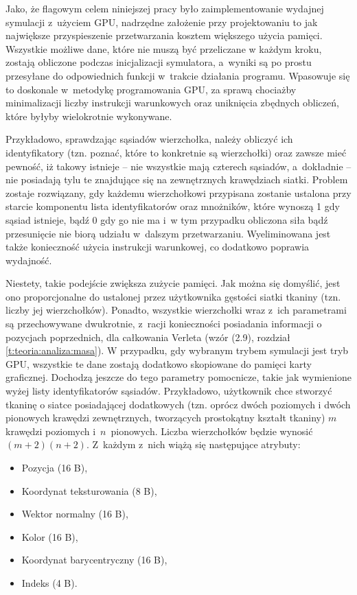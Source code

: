 	Jako, że flagowym celem niniejszej pracy było zaimplementowanie wydajnej symulacji z~użyciem GPU, nadrzędne założenie przy projektowaniu to jak największe przyspieszenie przetwarzania kosztem większego użycia pamięci. Wszystkie możliwe dane, które nie muszą być przeliczane w każdym kroku, zostają obliczone podczas inicjalizacji symulatora, a~wyniki są po prostu przesyłane do odpowiednich funkcji w~trakcie działania programu. Wpasowuje się to doskonale w~metodykę programowania GPU, za sprawą chociażby minimalizacji liczby instrukcji warunkowych oraz uniknięcia zbędnych obliczeń, które byłyby wielokrotnie wykonywane.
	
	Przykładowo, sprawdzając sąsiadów wierzchołka, należy obliczyć ich identyfikatory (tzn. poznać, które to konkretnie są wierzchołki) oraz zawsze mieć pewność, iż takowy istnieje -- nie wszystkie mają czterech sąsiadów, a~dokładnie -- nie posiadają tylu te znajdujące się na zewnętrznych krawędziach siatki. Problem zostaje rozwiązany, gdy każdemu wierzchołkowi przypisana zostanie ustalona przy starcie komponentu lista identyfikatorów oraz mnożników, które wynoszą 1 gdy sąsiad istnieje, bądź 0 gdy go nie ma i~w tym przypadku obliczona siła bądź przesunięcie nie biorą udziału w~dalszym przetwarzaniu. Wyeliminowana jest także konieczność użycia instrukcji warunkowej, co dodatkowo poprawia wydajność. 
	
	Niestety, takie podejście zwiększa zużycie pamięci. Jak można się domyślić, jest ono proporcjonalne do ustalonej przez użytkownika gęstości siatki tkaniny (tzn. liczby jej wierzchołków). Ponadto, wszystkie wierzchołki wraz z~ich parametrami są przechowywane dwukrotnie, z~racji konieczności posiadania informacji o pozycjach poprzednich, dla całkowania Verleta (wzór (2.9), rozdział \ref{t:teoria:analiza:masa}). W przypadku, gdy wybranym trybem symulacji jest tryb GPU, wszystkie te dane zostają dodatkowo skopiowane do pamięci karty graficznej. Dochodzą jeszcze do tego parametry pomocnicze, takie jak wymienione wyżej listy identyfikatorów sąsiadów. Przykładowo, użytkownik chce stworzyć tkaninę o siatce posiadającej dodatkowych (tzn. oprócz dwóch poziomych i dwóch pionowych krawędzi zewnętrznych, tworzących prostokątny kształt tkaniny) \(m\) krawędzi poziomych i~\(n\)~pionowych. Liczba wierzchołków będzie wynosić \( (m + 2)(n + 2) \). Z~każdym z~nich wiążą się następujące atrybuty:
	
	\begin{itemize}
		\item Pozycja (16 B),
		\item Koordynat teksturowania (8 B),
		\item Wektor normalny (16 B),
		\item Kolor (16 B),
		\item Koordynat barycentryczny (16 B),
		\item Indeks (4 B).
	\end{itemize}
	
